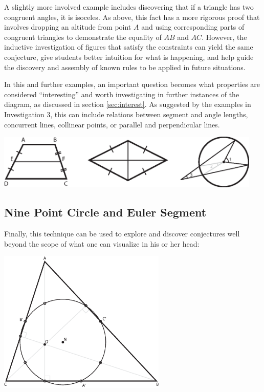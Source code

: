 \documentclass[10pt]{article}
\begin{document}
\onehalfspacing

A slightly more involved example includes discovering that if a
triangle has two congruent angles, it is isoceles.  As above, this
fact has a more rigorous proof that involves dropping an altitude from
point $A$ and using corresponding parts of congruent triangles to
demonstrate the equality of $AB$ and $AC$.  However, the inductive
investigation of figures that satisfy the constraints can yield the
same conjecture, give students better intuition for what is happening,
and help guide the discovery and assembly of known rules to be applied
in future situations.

In this and further examples, an important question becomes what
properties are considered ``interesting'' and worth investigating in
further instances of the diagram, as discussed in section
\ref{sec:interest}.  As suggested by the examples in Investigation 3,
this can include relations between segment and angle lengths,
concurrent lines, collinear points, or parallel and perpendicular
lines.

\singlespacing

\begin{center}
\includegraphics[width=0.95\textwidth]{diagrams/extra-diagrams.eps}
\end{center}


\onehalfspacing


\subsection{Nine Point Circle and Euler Segment}

Finally, this technique can be used to explore and discover
conjectures well beyond the scope of what one can visualize in his or
her head:

\singlespacing

\begin{center}
\includegraphics[width=0.6\textwidth]{diagrams/nine-point.eps}
\end{center}
\end{document}
